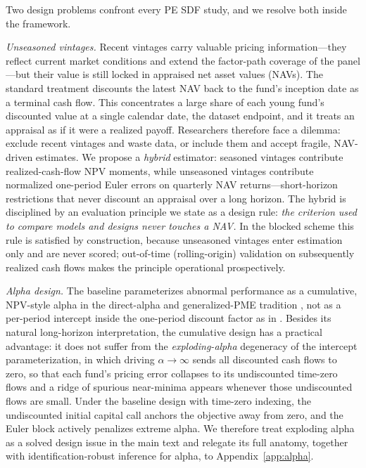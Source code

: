 \documentclass[11pt]{article}
\begin{document}
Two design problems confront every PE SDF study, and we resolve both inside the framework.

\emph{Unseasoned vintages.} Recent vintages carry valuable pricing information---they reflect current market conditions and extend the factor-path coverage of the panel---but their value is still locked in appraised net asset values (NAVs). The standard treatment discounts the latest NAV back to the fund's inception date as a terminal cash flow. This concentrates a large share of each young fund's discounted value at a single calendar date, the dataset endpoint, and it treats an appraisal as if it were a realized payoff. Researchers therefore face a dilemma: exclude recent vintages and waste data, or include them and accept fragile, NAV-driven estimates. We propose a \emph{hybrid} estimator: seasoned vintages contribute realized-cash-flow NPV moments, while unseasoned vintages contribute normalized one-period Euler errors on quarterly NAV returns---short-horizon restrictions that never discount an appraisal over a long horizon. The hybrid is disciplined by an evaluation principle we state as a design rule: \emph{the criterion used to compare models and designs never touches a NAV.} In the blocked scheme this rule is satisfied by construction, because unseasoned vintages enter estimation only and are never scored; out-of-time (rolling-origin) validation on subsequently realized cash flows makes the principle operational prospectively.

\emph{Alpha design.} The baseline parameterizes abnormal performance as a cumulative, NPV-style alpha in the direct-alpha and generalized-PME tradition \citep{GredilGriffithsStucke2023,KortewegNagel2016,KortewegNagel2025}, not as a per-period intercept inside the one-period discount factor as in \citet{DriessenLinPhalippou2012}. Besides its natural long-horizon interpretation, the cumulative design has a practical advantage: it does not suffer from the \emph{exploding-alpha} degeneracy of the intercept parameterization, in which driving \(\alpha\to\infty\) sends all discounted cash flows to zero, so that each fund's pricing error collapses to its undiscounted time-zero flows and a ridge of spurious near-minima appears whenever those undiscounted flows are small. Under the baseline design with time-zero indexing, the undiscounted initial capital call anchors the objective away from zero, and the Euler block actively penalizes extreme alpha. We therefore treat exploding alpha as a solved design issue in the main text and relegate its full anatomy, together with identification-robust inference for alpha, to Appendix~\ref{app:alpha}.
\end{document}
